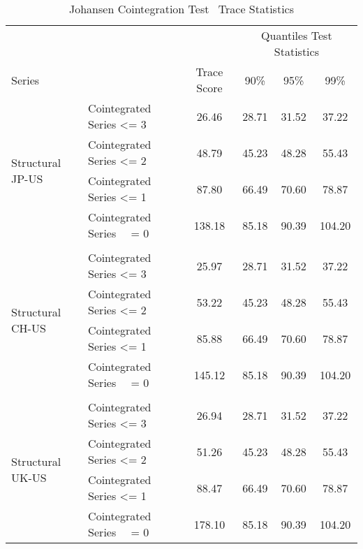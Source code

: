 \begin{table}[!h] %
  \centering
    \caption{Johansen Cointegration Test \textendash \ Trace Statistics}
  \begin{tabular}{llcccc} %
    \toprule
                                             &                                                 &               & \multicolumn{3}{c}{Quantiles Test Statistics}\\
    \cmidrule(r){1-6}
    Series                                   &                                                 & Trace Score   &  90\%     & 95\%     & 99\%\\
    \midrule
    \multirow{4}{*}{Structural JP-US}        & \multicolumn{1}{l}{Cointegrated Series <= 3}    & 26.46         & 28.71     & 31.52    & 37.22  \\
                                             & \multicolumn{1}{l}{Cointegrated Series <= 2}    & 48.79         & 45.23     & 48.28    & 55.43  \\ 
                                             & \multicolumn{1}{l}{Cointegrated Series <= 1}    & 87.80         & 66.49     & 70.60    & 78.87  \\
                                             & \multicolumn{1}{l}{Cointegrated Series \ \ = 0} & 138.18        & 85.18     & 90.39    & 104.20 \\
    \\
    \multirow{4}{*}{Structural CH-US}        & \multicolumn{1}{l}{Cointegrated Series <= 3}    & 25.97         & 28.71     & 31.52    & 37.22  \\
                                             & \multicolumn{1}{l}{Cointegrated Series <= 2}    & 53.22         & 45.23     & 48.28    & 55.43  \\ 
                                             & \multicolumn{1}{l}{Cointegrated Series <= 1}    & 85.88         & 66.49     & 70.60    & 78.87  \\
                                             & \multicolumn{1}{l}{Cointegrated Series \ \ = 0} & 145.12        & 85.18     & 90.39    & 104.20 \\
    \\
    \multirow{4}{*}{Structural UK-US}        & \multicolumn{1}{l}{Cointegrated Series <= 3}    & 26.94         & 28.71     & 31.52    & 37.22  \\
                                             & \multicolumn{1}{l}{Cointegrated Series <= 2}    & 51.26         & 45.23     & 48.28    & 55.43  \\ 
                                             & \multicolumn{1}{l}{Cointegrated Series <= 1}    & 88.47         & 66.49     & 70.60    & 78.87  \\
                                             & \multicolumn{1}{l}{Cointegrated Series \ \ = 0} & 178.10        & 85.18     & 90.39    & 104.20 \\
    \bottomrule
  \end{tabular}
\label{tab:Cointegration}
\end{table}

